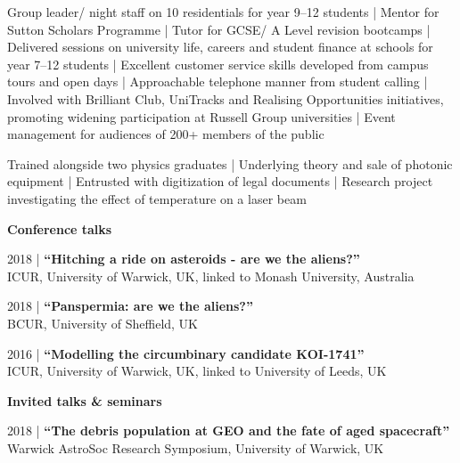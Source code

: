 \documentclass[10pt,a4paper]{altacv}
\begin{document}
\divider

\vspace{-1em}
\small \justify Group leader/ night staff on 10 residentials for year 9--12 students |
Mentor for Sutton Scholars Programme | 
Tutor for GCSE/ A Level revision bootcamps |
Delivered sessions on university life, careers and student finance at schools for year 7--12 students |
Excellent customer service skills developed from campus tours and open days |
Approachable telephone manner from student calling |
Involved with Brilliant Club, UniTracks and Realising Opportunities initiatives, promoting widening participation at Russell Group universities |
Event management for audiences of 200+ members of the public

\divider

\vspace{-1em}
\small \justify Trained alongside two physics graduates | 
Underlying theory and sale of photonic equipment |
Entrusted with digitization of legal documents |
Research project investigating the effect of temperature on a laser beam

\clearpage


\normalsize \textbf{Conference talks}

\medskip

\small 2018 | \textbf{``Hitching a ride on asteroids - are we the aliens?''} \\
ICUR, University of Warwick, UK, linked to Monash University, Australia

\smallskip

\small 2018 | \textbf{``Panspermia: are we the aliens?''} \\
BCUR, University of Sheffield, UK

\smallskip

\small 2016 | \textbf{``Modelling the circumbinary candidate KOI-1741''} \\
ICUR, University of Warwick, UK, linked to University of Leeds, UK

\divider

\normalsize \textbf{Invited talks \& seminars}

\medskip

\small 2018 | \textbf{``The debris population at GEO and the fate of aged spacecraft''} \\
Warwick AstroSoc Research Symposium, University of Warwick, UK
\end{document}
